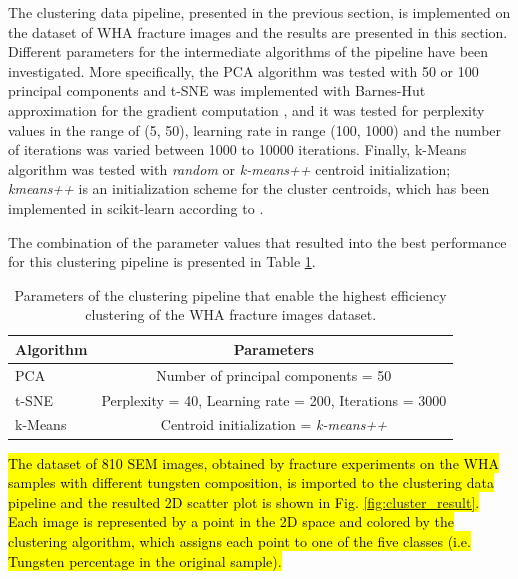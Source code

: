 \documentclass[authoryear,preprint,review,12pt, singleside]{elsarticle}
\begin{document}
The clustering data pipeline, presented in the previous section, is implemented on the dataset of WHA fracture images and the results are presented in this section. Different parameters for the intermediate algorithms of the pipeline have been investigated. More specifically, the PCA algorithm was tested with 50 or 100 principal components and t-SNE was implemented with Barnes-Hut approximation for the gradient computation \citep{barnes},  and it was tested for perplexity values in the range of (5, 50), learning rate in range (100, 1000) and the number of iterations was varied between 1000 to 10000 iterations. Finally, k-Means algorithm was tested with \textit{random} or \textit{k-means++} centroid initialization; \textit{kmeans++} is an initialization scheme for the cluster centroids, which has been implemented in scikit-learn according to \citet{kmeans2}.  

The combination of the parameter values that resulted into the best performance for this clustering pipeline is presented in Table \ref{table:clust}.  


\begin{table}[h]
	\centering
	\begin{tabular}[t]{ l  c } 
		\toprule
		Algorithm \hspace{1ex}  &  Parameters \\ \toprule
		PCA       \hspace{1ex}  &  Number of principal components = 50 \\
		t-SNE     \hspace{1ex}  &  Perplexity = 40, Learning rate = 200, Iterations = 3000 \\
		k-Means   \hspace{1ex}  &  Centroid initialization = \textit{k-means++} \\
		\bottomrule
	\end{tabular}
	\caption{Parameters of the clustering pipeline that enable the highest efficiency clustering of the WHA fracture images dataset.}
	\label{table:clust} 
\end{table} 

\hl{The dataset of 810 SEM images, obtained by fracture experiments on the WHA samples with different tungsten composition, is imported to the clustering data pipeline and the resulted 2D scatter plot is shown in Fig. {\ref{fig:cluster_result}}.  Each image is represented by a point in the 2D space and colored by the clustering algorithm, which assigns each point to one of the five classes (i.e. Tungsten percentage in the original sample).}
\end{document}
